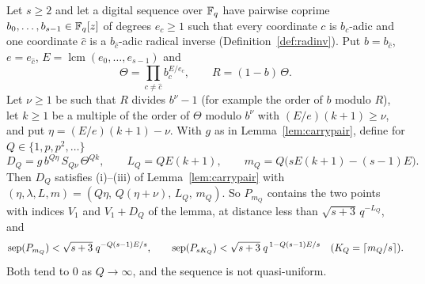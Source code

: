 \begin{theorem}\label{thm:nonqu}
Let $s\ge2$ and let a digital sequence over $\mathbb{F}_q$ have pairwise coprime $b_0,\dots,b_{s-1}\in\mathbb{F}_q[z]$ of degrees $e_c\ge1$ such that every coordinate $c$ is $b_c$-adic and one coordinate $\hat c$ is a $b_{\hat c}$-adic radical inverse (Definition~\ref{def:radinv}). Put $b=b_{\hat c}$, $e=e_{\hat c}$, $E=\operatorname{lcm}(e_0,\dots,e_{s-1})$ and
\[
\Theta=\prod_{c\ne\hat c}b_c^{E/e_c},\qquad R=(1-b)\,\Theta .
\]
Let $\nu\ge1$ be such that $R$ divides $b^\nu-1$ (for example the order of $b$ modulo $R$), let $k\ge1$ be a multiple of the order of $\Theta$ modulo $b^\nu$ with $(E/e)(k+1)\ge\nu$, and put $\eta=(E/e)(k+1)-\nu$. With $g$ as in Lemma~\ref{lem:carrypair}, define for $Q\in\{1,p,p^2,\dots\}$
\[
D_Q=g\,b^{Q\eta}\,S_{Q\nu}\,\Theta^{Qk},\qquad L_Q=QE(k+1),\qquad m_Q=Q\bigl(sE(k+1)-(s-1)E\bigr).
\]
Then $D_Q$ satisfies (i)--(iii) of Lemma~\ref{lem:carrypair} with $(\eta,\lambda,L,m)=(Q\eta,\,Q(\eta+\nu),\,L_Q,\,m_Q)$. So $P_{m_Q}$ contains the two points with indices $V_1$ and $V_1+D_Q$ of the lemma, at distance less than $\sqrt{s+3}\,q^{-L_Q}$, and
\[
\operatorname{sep}(P_{m_Q})<\sqrt{s+3}\;q^{-Q(s-1)E/s},\qquad \operatorname{sep}(P_{sK_Q})<\sqrt{s+3}\;q^{\,1-Q(s-1)E/s}\quad(K_Q=\lceil m_Q/s\rceil).
\]
Both tend to $0$ as $Q\to\infty$, and the sequence is not quasi-uniform.
\end{theorem}


